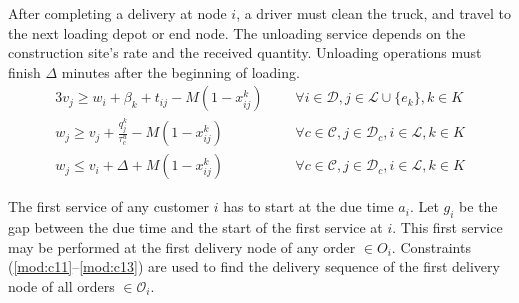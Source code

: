 \documentclass{article}
\begin{document}
After completing a delivery  at node $i$, a driver must clean the truck, and travel to the next loading depot or end node. The unloading service depends on the construction site's rate and the received quantity. Unloading operations must finish $\Delta$ minutes after the beginning of loading.
\begin{alignat}{3}
    \label{mod:c7}     v_j \geq  w_i + \beta_{k} + t_{ij} - M\left(1-x^{k}_{ij}\right) & \text{ }& \forall i \in \mathcal{D}, j \in \mathcal{L} \cup \{e_k\},   k \in K \\
    \label{mod:c8}          w_{j} \geq v_{j}  + {  \frac{q^k_j}{\tau^u_c} -M\left(1- x^{k}_{ij}\right) } & \text{ }&  \forall c \in  \mathcal{C}, j \in \mathcal{D}_{c}, i \in \mathcal{L},  k \in K \\
    \label{mod:c31}          w_{j} \leq v_{i}  + \Delta + M\left(1- x^{k}_{ij}\right)&  \text{ }&  \forall c \in  \mathcal{C}, j \in \mathcal{D}_{c}, i \in \mathcal{L},  k \in K
\end{alignat}

The first service of any customer $i$ has to start at the due time $a_i$. Let $g_i$ be the gap between the due time and the start of the first service at $i$. This first service may be performed at the first delivery node of any order $\in O_i$. Constraints (\ref{mod:c11}--\ref{mod:c13}) are used to find the delivery sequence of the first delivery node of all orders $\in \mathcal{O}_i$.
\end{document}
